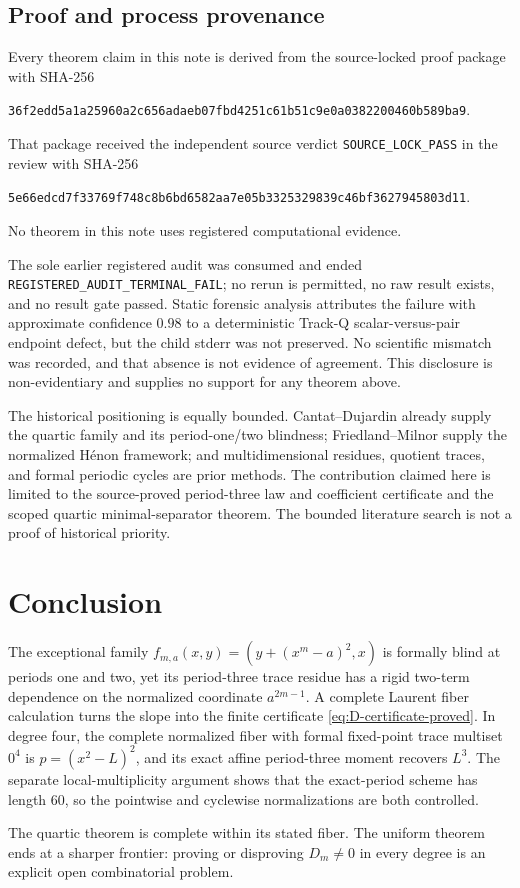 \documentclass[11pt]{article}
\theoremstyle{definition}
\theoremstyle{remark}
\begin{document}
\subsection{Proof and process provenance}

Every theorem claim in this note is derived from the source-locked proof
package with SHA-256
\begin{center}
\small\texttt{36f2edd5a1a25960a2c656adaeb07fbd4251c61b51c9e0a0382200460b589ba9}.
\end{center}
That package received the independent source verdict
\texttt{SOURCE\_LOCK\_PASS} in the review with SHA-256
\begin{center}
\small\texttt{5e66edcd7f33769f748c8b6bd6582aa7e05b3325329839c46bf3627945803d11}.
\end{center}
No theorem in this note uses registered computational evidence.

The sole earlier registered audit was consumed and ended
\texttt{REGISTERED\_AUDIT\_TERMINAL\_FAIL}; no rerun is permitted, no raw
result exists, and no result gate passed.  Static forensic analysis attributes
the failure with approximate confidence \(0.98\) to a deterministic Track-Q
scalar-versus-pair endpoint defect, but the child stderr was not preserved.
No scientific mismatch was recorded, and that absence is not evidence of
agreement.  This disclosure is non-evidentiary and supplies no support for
any theorem above.

The historical positioning is equally bounded.  Cantat--Dujardin already
supply the quartic family and its period-one/two blindness;
Friedland--Milnor supply the normalized H\'enon framework; and
multidimensional residues, quotient traces, and formal periodic cycles are
prior methods.  The contribution claimed here is limited to the
source-proved period-three law and coefficient certificate and the scoped
quartic minimal-separator theorem.  The bounded literature search is not a
proof of historical priority.

\section{Conclusion}
\label{sec:conclusion}

The exceptional family \(f_{m,a}(x,y)=(y+(x^m-a)^2,x)\) is formally blind
at periods one and two, yet its period-three trace residue has a rigid
two-term dependence on the normalized coordinate \(a^{2m-1}\).  A complete
Laurent fiber calculation turns the slope into the finite certificate
\eqref{eq:D-certificate-proved}.  In degree four, the complete normalized
fiber with formal fixed-point trace multiset \(0^4\) is
\(p=(x^2-L)^2\), and its exact affine period-three moment recovers \(L^3\).
The separate local-multiplicity argument shows that the exact-period scheme
has length \(60\), so the pointwise and cyclewise normalizations are both
controlled.

The quartic theorem is complete within its stated fiber.  The uniform theorem
ends at a sharper frontier: proving or disproving
\(D_m\ne0\) in every degree is an explicit open combinatorial problem.



\end{document}

